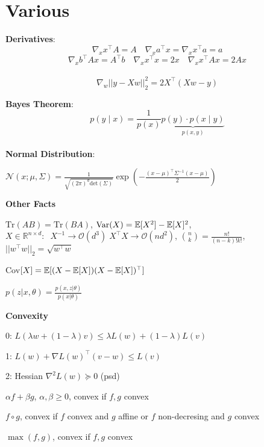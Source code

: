 \section*{Various}

\textbf{Derivatives}:
$$\nabla_x x^\top A = A \quad \nabla_x a^\top x = \nabla_x x^\top a = a$$
$$\nabla_x b^\top A x = A^\top b \quad \nabla_x x^\top x = 2x \quad \nabla_x x^\top A x = 2 Ax$$\\[-20pt]
$$\nabla_w || y-Xw||_2^2 = 2X^\top(Xw-y)$$

\textbf{Bayes Theorem}: \\[-13pt]
$$p(y \; | \; x) = \frac{1}{p(x)} \underbrace{p(y) \cdot p(x \; | \; y)}_{p(x,y)}$$ \\[-23pt]

\textbf{Normal Distribution}:

$\mathcal{N}(x; \mu, \Sigma) = \frac{1}{\sqrt{(2 \pi)^d \text{det}(\Sigma)}} \exp(-\frac{(x - \mu)^\top \Sigma^{-1} (x-\mu)}{2})$

\textbf{Other Facts}

$\text{Tr}(AB) = \text{Tr}(BA)$, $\text{Var}(X) = \mathbb{E}[X^2] - \mathbb{E}[X]^2$, $X \in \mathbb{R}^{n \times d}: \; \; X^{-1} \rightarrow \mathcal{O}(d^3) \; X^\top X \rightarrow \mathcal{O}(nd^2)$, $\binom{n}{k} = \frac{n!}{(n-k)!k!}$, $||w^\top w||_2 = \sqrt{w^\top w}$
 
Cov$[X] = \mathbb{E}[(X- \mathbb{E}[X])(X- \mathbb{E}[X])^\top]$

$p(z|x,\theta) = \frac{p(x,z|\theta)}{p(x | \theta)}$

\textbf{Convexity}

0: $L(\lambda w + (1 - \lambda)v) \leq \lambda L (w) + (1- \lambda) L(v)$

1: $L(w) + \nabla L(w)^\top (v - w) \leq L(v)$

2: Hessian $\nabla^2 L (w) \succcurlyeq 0$ (psd)

\begin{compactitem}
	\item $\alpha f + \beta g$, $\alpha, \beta \geq 0$, convex if $f, g$ convex
	\item $f \circ g$, convex if $f$ convex and $g$ affine or $f$ non-decresing and $g$ convex
	\item $\max(f, g)$, convex if $f,g$ convex
\end{compactitem}
